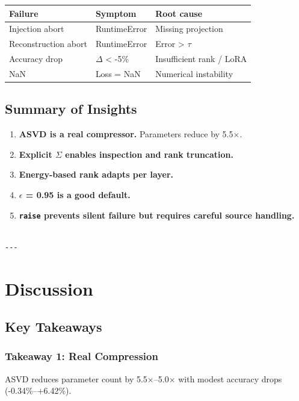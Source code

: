 \begin{table}[H]
\centering
\small
\begin{tabular}{lll}
\toprule
\textbf{Failure} & \textbf{Symptom} & \textbf{Root cause} \\
\midrule
Injection abort & RuntimeError & Missing projection \\
Reconstruction abort & RuntimeError & Error > $\tau$ \\
Accuracy drop & $\Delta$ < -5\% & Insufficient rank / LoRA \\
NaN & Loss = NaN & Numerical instability \\
\bottomrule
\end{tabular}
\end{table}

\subsection{Summary of Insights}

\begin{enumerate}
\item \textbf{ASVD is a real compressor.} Parameters reduce by 5.5$\times$.
\item \textbf{Explicit $\Sigma$ enables inspection and rank truncation.}
\item \textbf{Energy-based rank adapts per layer.}
\item \textbf{$\epsilon$ = 0.95 is a good default.}
\item \textbf{\texttt{raise} prevents silent failure but requires careful source handling.}
\end{enumerate}
\begin{lstlisting}

---
\end{lstlisting}


\section{Discussion}

\subsection{Key Takeaways}

\subsubsection{Takeaway 1: Real Compression}

ASVD reduces parameter count by 5.5$\times$--5.0$\times$ with modest 
accuracy drops (-0.34\%--+6.42\%).


